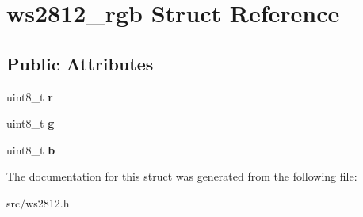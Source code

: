 \hypertarget{structws2812__rgb}{}\section{ws2812\+\_\+rgb Struct Reference}
\label{structws2812__rgb}
\subsection*{Public Attributes}
\begin{DoxyCompactItemize}
\item 
\hypertarget{structws2812__rgb_accf7188c624788256477c2e4ee54515b}{}uint8\+\_\+t {\bfseries r}\label{structws2812__rgb_accf7188c624788256477c2e4ee54515b}

\item 
\hypertarget{structws2812__rgb_aaf5b0f4db796641e1cd16bd4f70fc7ac}{}uint8\+\_\+t {\bfseries g}\label{structws2812__rgb_aaf5b0f4db796641e1cd16bd4f70fc7ac}

\item 
\hypertarget{structws2812__rgb_ae6d6d19362a79c36178203b3123d2e7e}{}uint8\+\_\+t {\bfseries b}\label{structws2812__rgb_ae6d6d19362a79c36178203b3123d2e7e}

\end{DoxyCompactItemize}


The documentation for this struct was generated from the following file\+:\begin{DoxyCompactItemize}
\item 
src/ws2812.\+h\end{DoxyCompactItemize}
